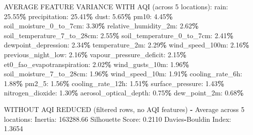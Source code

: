 \documentclass[
  letterpaper,
  DIV=11,
  numbers=noendperiod]{scrartcl}
\newenvironment{Shaded}{\begin{snugshade}}{\end{snugshade}}
\newcommand{\DecValTok}[1]{\textcolor[rgb]{0.00,0.00,0.81}{#1}}
\newcommand{\FloatTok}[1]{\textcolor[rgb]{0.00,0.00,0.81}{#1}}
\newcommand{\NormalTok}[1]{#1}
\newcommand{\OperatorTok}[1]{\textcolor[rgb]{0.81,0.36,0.00}{\textbf{#1}}}
\begin{document}
\begin{Shaded}
\begin{Highlighting}[]
\NormalTok{AVERAGE FEATURE VARIANCE WITH AQI (across }\DecValTok{5}\NormalTok{ locations):}
\NormalTok{  rain: }\FloatTok{25.55}\OperatorTok{\%}
\NormalTok{  precipitation: }\FloatTok{25.41}\OperatorTok{\%}
\NormalTok{  dust: }\FloatTok{5.65}\OperatorTok{\%}
\NormalTok{  pm10: }\FloatTok{4.45}\OperatorTok{\%}
\NormalTok{  soil\_moisture\_0\_to\_7cm: }\FloatTok{3.30}\OperatorTok{\%}
\NormalTok{  relative\_humidity\_2m: }\FloatTok{2.62}\OperatorTok{\%}
\NormalTok{  soil\_temperature\_7\_to\_28cm: }\FloatTok{2.55}\OperatorTok{\%}
\NormalTok{  soil\_temperature\_0\_to\_7cm: }\FloatTok{2.41}\OperatorTok{\%}
\NormalTok{  dewpoint\_depression: }\FloatTok{2.34}\OperatorTok{\%}
\NormalTok{  temperature\_2m: }\FloatTok{2.29}\OperatorTok{\%}
\NormalTok{  wind\_speed\_100m: }\FloatTok{2.16}\OperatorTok{\%}
\NormalTok{  previous\_night\_low: }\FloatTok{2.16}\OperatorTok{\%}
\NormalTok{  vapour\_pressure\_deficit: }\FloatTok{2.15}\OperatorTok{\%}
\NormalTok{  et0\_fao\_evapotranspiration: }\FloatTok{2.02}\OperatorTok{\%}
\NormalTok{  wind\_gusts\_10m: }\FloatTok{1.96}\OperatorTok{\%}
\NormalTok{  soil\_moisture\_7\_to\_28cm: }\FloatTok{1.96}\OperatorTok{\%}
\NormalTok{  wind\_speed\_10m: }\FloatTok{1.91}\OperatorTok{\%}
\NormalTok{  cooling\_rate\_6h: }\FloatTok{1.88}\OperatorTok{\%}
\NormalTok{  pm2\_5: }\FloatTok{1.56}\OperatorTok{\%}
\NormalTok{  cooling\_rate\_12h: }\FloatTok{1.51}\OperatorTok{\%}
\NormalTok{  surface\_pressure: }\FloatTok{1.43}\OperatorTok{\%}
\NormalTok{  nitrogen\_dioxide: }\FloatTok{1.30}\OperatorTok{\%}
\NormalTok{  aerosol\_optical\_depth: }\FloatTok{0.75}\OperatorTok{\%}
\NormalTok{  dew\_point\_2m: }\FloatTok{0.68}\OperatorTok{\%}

\NormalTok{WITHOUT AQI REDUCED (filtered rows, no AQI features) }\OperatorTok{{-}}\NormalTok{ Average across }\DecValTok{5}\NormalTok{ locations:}
\NormalTok{  Inertia: }\FloatTok{163288.66}
\NormalTok{  Silhouette Score: }\FloatTok{0.2110}
\NormalTok{  Davies}\OperatorTok{{-}}\NormalTok{Bouldin Index: }\FloatTok{1.3654}


\end{Highlighting}
\end{Shaded}
\end{document}

